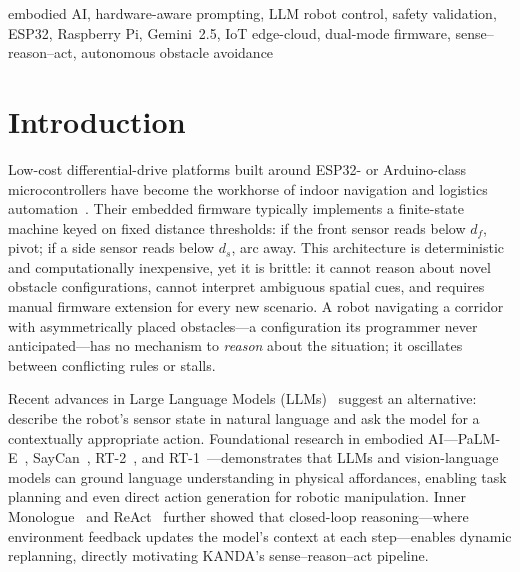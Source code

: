 \documentclass[conference]{IEEEtran}
\begin{document}
\begin{abstract}
The complete hardware bill of materials totals under \$60.
Bench demonstrations across three scenario classes and four fault
conditions confirm that hardware-aware prompting produces contextually
appropriate commands while the validation layer prevents unsafe actuation
in every tested failure mode.
A controlled prompt ablation study quantifies a 30\% increase in
invalid-command rate when the action vocabulary is removed, and a 20\% increase
in unsafe forward commands when proximity safety rules are removed,
confirming that specification-level and runtime alignment layers address
orthogonal failure modes and are jointly necessary.
\end{abstract}

\begin{IEEEkeywords}
embodied AI, hardware-aware prompting, LLM robot control, safety validation,
ESP32, Raspberry Pi, Gemini~2.5, IoT edge-cloud, dual-mode firmware,
sense--reason--act, autonomous obstacle avoidance
\end{IEEEkeywords}

\section{Introduction}
\label{sec:intro}

Low-cost differential-drive platforms built around ESP32- or Arduino-class
microcontrollers have become the workhorse of indoor navigation and logistics
automation~\cite{ifr2024report,atzori2010iot}.
Their embedded firmware typically implements a finite-state machine keyed on
fixed distance thresholds: if the front sensor reads below $d_{f}$, pivot;
if a side sensor reads below $d_{s}$, arc away.
This architecture is deterministic and computationally inexpensive, yet it
is brittle: it cannot reason about novel obstacle configurations, cannot
interpret ambiguous spatial cues, and requires manual firmware extension for
every new scenario.
A robot navigating a corridor with asymmetrically placed obstacles---a
configuration its programmer never anticipated---has no mechanism to
\emph{reason} about the situation; it oscillates between conflicting rules
or stalls.

Recent advances in Large Language Models (LLMs)~\cite{brown2020gpt3,
openai2023gpt4, gemini2023report} suggest an alternative: describe the robot's
sensor state in natural language and ask the model for a contextually
appropriate action.
Foundational research in embodied AI---PaLM-E~\cite{driess2023palme},
SayCan~\cite{ahn2022saycan}, RT-2~\cite{brohan2023rt2}, and
RT-1~\cite{brohan2022rt1}---demonstrates that LLMs and vision-language models
can ground language understanding in physical affordances, enabling task
planning and even direct action generation for robotic manipulation.
Inner Monologue~\cite{huang2022innermonologue} and
ReAct~\cite{yao2023react} further showed that closed-loop reasoning---where
environment feedback updates the model's context at each step---enables dynamic
replanning, directly motivating KANDA's sense--reason--act pipeline.
\end{document}
